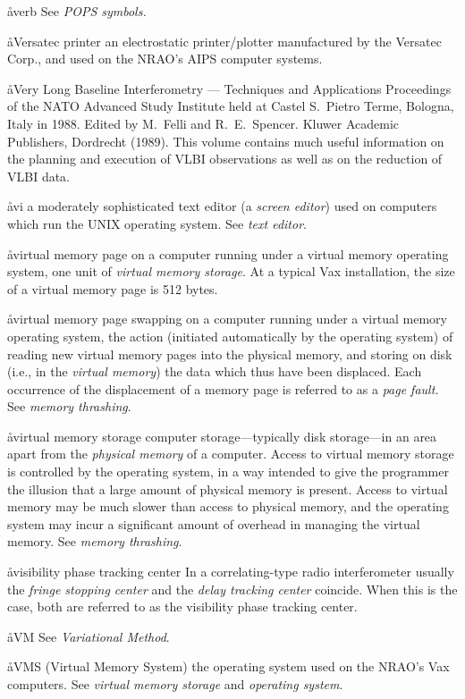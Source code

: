 \aa{verb} See {\it POPS symbols.}

\aa{Versatec printer}
an electrostatic printer\slash plotter manufactured by the Versatec Corp.,
and used on the NRAO's AIPS computer systems.

\aa{Very Long Baseline Interferometry --- Techniques and Applications}
Proceedings of the NATO Advanced Study Institute held at Castel S.\ Pietro
Terme, Bologna, Italy in 1988.  Edited by M.\ Felli and R.\ E.\ Spencer.
Kluwer Academic Publishers, Dordrecht (1989).
This volume contains much useful information on the planning and execution
of VLBI observations as well as on the reduction of VLBI data.

\aa{vi}
a moderately sophisticated text editor (a {\it screen editor}) used
on computers which run the UNIX operating system.
See {\it text editor}.

\aa{virtual memory page}
on a computer running under a virtual memory operating system,
one unit of {\it virtual memory storage}.
At a typical Vax installation, the size of a virtual memory page
is 512 bytes.

\aa{virtual memory page swapping}
on a computer running under a virtual memory operating system,
the action (initiated automatically by the operating system) of reading
new virtual memory pages into the physical memory, and
storing on disk (i.e., in the {\it virtual memory}\/)
the data which thus have been displaced.
Each occurrence of the displacement of a memory page
is referred to as a {\it page fault.}
See {\it memory thrashing}.

\aa{virtual memory storage}
computer storage---typically disk storage---in an area apart
from the {\it physical memory} of a computer.
Access to virtual memory storage is controlled by the operating system,
in a way intended to give the programmer the illusion that a large amount
of physical memory is present.
Access to virtual memory may be much slower than access to physical
memory, and the operating system may incur a significant amount of
overhead in managing the virtual memory.
See {\it memory thrashing}.

\aa{visibility phase tracking center}
In a correlating-type radio interferometer
usually the {\it fringe stopping center} and the {\it delay tracking
center} coincide.
When this is the case, both are referred to as the visibility
phase tracking center.

\aa{VM} See {\it Variational Method}.

\aa{VMS}
(Virtual Memory System) the operating system used on the
NRAO's Vax computers.
See {\it virtual memory storage} and {\it operating system}.

